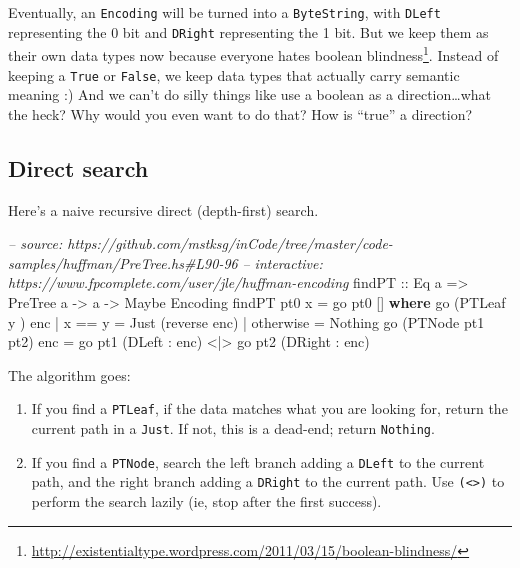 \documentclass[]{article}
\newenvironment{Shaded}{}{}
\newcommand{\KeywordTok}[1]{\textcolor[rgb]{0.00,0.44,0.13}{\textbf{{#1}}}}
\newcommand{\DataTypeTok}[1]{\textcolor[rgb]{0.56,0.13,0.00}{{#1}}}
\newcommand{\CommentTok}[1]{\textcolor[rgb]{0.38,0.63,0.69}{\textit{{#1}}}}
\newcommand{\OtherTok}[1]{\textcolor[rgb]{0.00,0.44,0.13}{{#1}}}
\newcommand{\FunctionTok}[1]{\textcolor[rgb]{0.02,0.16,0.49}{{#1}}}
\newcommand{\NormalTok}[1]{{#1}}
\renewcommand{\href}[2]{#2\footnote{\url{#1}}}
\begin{document}
Eventually, an \texttt{Encoding} will be turned into a
\texttt{ByteString}, with \texttt{DLeft} representing the 0 bit and
\texttt{DRight} representing the 1 bit. But we keep them as their own
data types now because everyone hates
\href{http://existentialtype.wordpress.com/2011/03/15/boolean-blindness/}{boolean
blindness}. Instead of keeping a \texttt{True} or \texttt{False}, we
keep data types that actually carry semantic meaning :) And we can't do
silly things like use a boolean as a direction\ldots{}what the heck? Why
would you even want to do that? How is ``true'' a direction?

\subsection{Direct search}\label{direct-search}

Here's a naive recursive direct (depth-first) search.

\begin{Shaded}
\begin{Highlighting}[]
\CommentTok{-- source: https://github.com/mstksg/inCode/tree/master/code-samples/huffman/PreTree.hs#L90-96}
\CommentTok{-- interactive: https://www.fpcomplete.com/user/jle/huffman-encoding}
\OtherTok{findPT ::} \DataTypeTok{Eq} \NormalTok{a }\OtherTok{=>} \DataTypeTok{PreTree} \NormalTok{a }\OtherTok{->} \NormalTok{a }\OtherTok{->} \DataTypeTok{Maybe} \DataTypeTok{Encoding}
\NormalTok{findPT pt0 x }\FunctionTok{=} \NormalTok{go pt0 []}
  \KeywordTok{where}
    \NormalTok{go (}\DataTypeTok{PTLeaf} \NormalTok{y      ) enc }\FunctionTok{|} \NormalTok{x }\FunctionTok{==} \NormalTok{y    }\FunctionTok{=} \DataTypeTok{Just} \NormalTok{(reverse enc)}
                            \FunctionTok{|} \NormalTok{otherwise }\FunctionTok{=} \DataTypeTok{Nothing}
    \NormalTok{go (}\DataTypeTok{PTNode} \NormalTok{pt1 pt2) enc }\FunctionTok{=} \NormalTok{go pt1 (}\DataTypeTok{DLeft}  \FunctionTok{:} \NormalTok{enc) }\FunctionTok{<|>}
                              \NormalTok{go pt2 (}\DataTypeTok{DRight} \FunctionTok{:} \NormalTok{enc)}
\end{Highlighting}
\end{Shaded}

The algorithm goes:

\begin{enumerate}
\def\labelenumi{\arabic{enumi}.}
\item
  If you find a \texttt{PTLeaf}, if the data matches what you are
  looking for, return the current path in a \texttt{Just}. If not, this
  is a dead-end; return \texttt{Nothing}.
\item
  If you find a \texttt{PTNode}, search the left branch adding a
  \texttt{DLeft} to the current path, and the right branch adding a
  \texttt{DRight} to the current path. Use
  \texttt{(\textless{}\textbar{}\textgreater{})} to perform the search
  lazily (ie, stop after the first success).
\end{enumerate}
\end{document}
